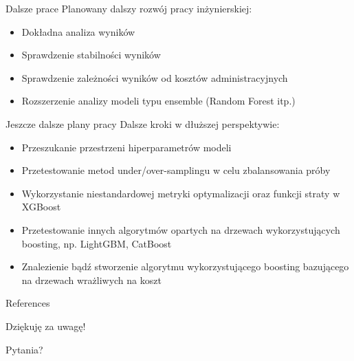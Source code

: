 \documentclass[10pt]{beamer}
\begin{document}
\begin{frame}{Dalsze prace}
    Planowany dalszy rozwój pracy inżynierskiej:
    \begin{itemize}
        \item Dokładna analiza wyników
        \item Sprawdzenie stabilności wyników
        \item Sprawdzenie zależności wyników od kosztów administracyjnych
        \item Rozszerzenie analizy modeli typu ensemble (Random Forest itp.)
    \end{itemize}{}
\end{frame}{}

\begin{frame}{Jeszcze dalsze plany pracy}
    Dalsze kroki w dłuższej perspektywie:
    \begin{itemize}
        \item Przeszukanie przestrzeni hiperparametrów modeli
        \item Przetestowanie metod under/over-samplingu w celu zbalansowania próby
        \item Wykorzystanie niestandardowej metryki optymalizacji oraz funkcji straty w XGBoost
        \item Przetestowanie innych algorytmów opartych na drzewach wykorzystujących boosting, np. LightGBM, CatBoost
        \item Znalezienie bądź stworzenie algorytmu wykorzystującego boosting bazującego na drzewach wrażliwych na koszt
    \end{itemize}{}
\end{frame}


\begin{frame}[allowframebreaks]{References}

  
  

\end{frame}

{
\begin{frame}
    \centering
    {\Large Dziękuję za uwagę!}
    
    \bigskip
    
    Pytania?
\end{frame}
}
\end{document}
